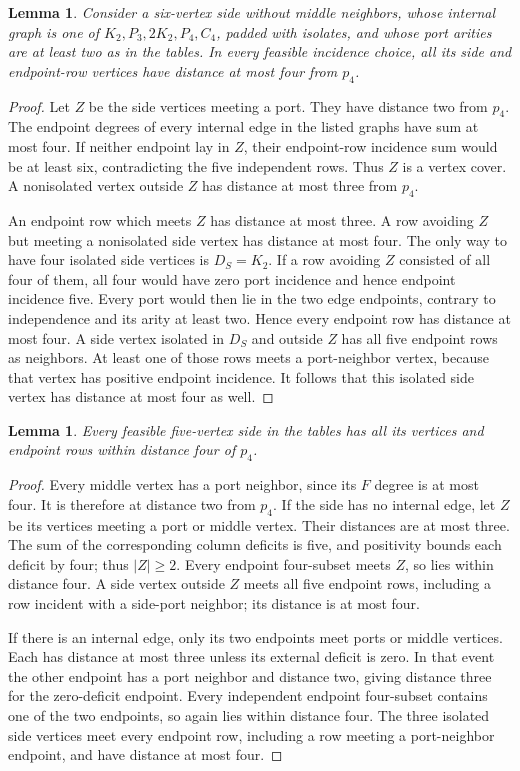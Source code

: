 \documentclass[11pt]{article}
\newtheorem{lemma}[theorem]{Lemma}
\begin{document}
\begin{lemma}\label{sixradius}
Consider a six-vertex side without middle neighbors, whose internal graph
is one of $K_2,P_3,2K_2,P_4,C_4$, padded with isolates, and whose port
arities are at least two as in the tables. In every feasible incidence
choice, all its side and endpoint-row vertices have distance at most
four from $p_4$.
\end{lemma}
\begin{proof}
Let $Z$ be the side vertices meeting a port. They have distance two
from $p_4$. The endpoint degrees of every internal edge in the listed
graphs have sum at most four. If neither endpoint lay in $Z$, their
endpoint-row incidence sum would be at least six, contradicting the
five independent rows. Thus $Z$ is a vertex cover. A nonisolated vertex
outside $Z$ has distance at most three from $p_4$.

An endpoint row which meets $Z$ has distance at most three. A row
avoiding $Z$ but meeting a nonisolated side vertex has distance at most
four. The only way to have four isolated side vertices is $D_S=K_2$.
If a row avoiding $Z$ consisted of all four of them, all four would
have zero port incidence and hence endpoint incidence five. Every port would
then lie in the two edge endpoints, contrary to independence and its
arity at least two. Hence every endpoint row has distance at most four.
A side vertex isolated in $D_S$ and outside $Z$ has all five endpoint
rows as neighbors. At least one of those rows meets a port-neighbor
vertex, because that vertex has positive endpoint incidence. It follows
that this isolated side vertex has distance at most four as well.
\end{proof}

\begin{lemma}\label{fiveradius}
Every feasible five-vertex side in the tables has all its vertices and
endpoint rows within distance four of $p_4$.
\end{lemma}
\begin{proof}
Every middle vertex has a port neighbor, since its $F$ degree is at
most four. It is therefore at distance two from $p_4$. If the side has
no internal edge, let $Z$ be its vertices meeting a port or middle
vertex. Their distances are at most three. The sum of the corresponding
column deficits is five, and positivity bounds each deficit by four;
thus $|Z|\geq2$. Every endpoint four-subset meets $Z$, so lies within
distance four. A side vertex outside $Z$ meets all five endpoint rows,
including a row incident with a side-port neighbor; its distance is
at most four.

If there is an internal edge, only its two endpoints meet ports or
middle vertices. Each has distance at most three unless its external
deficit is zero. In that event the other endpoint has a port neighbor
and distance two, giving distance three for the zero-deficit endpoint.
Every independent endpoint four-subset contains one of the two endpoints,
so again lies within distance four. The three isolated side vertices
meet every endpoint row, including a row meeting a port-neighbor
endpoint, and have distance at most four.
\end{proof}
\end{document}
